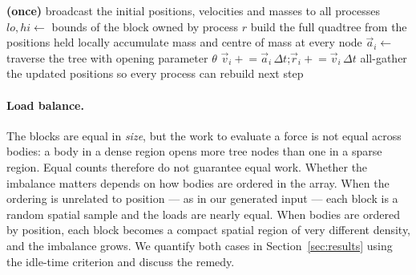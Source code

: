 \documentclass[11pt,a4paper]{article}
\begin{document}
\begin{algorithm}[H]
\caption{One Barnes--Hut time step on process $r$ of $P$ (MPI; the hybrid
program threads the marked loop with OpenMP).}
\label{alg:mpi}
\begin{algorithmic}[1]
\State \textbf{(once)} broadcast the initial positions, velocities and masses to all processes
\State $lo,hi \gets$ bounds of the block owned by process $r$ 
  \State build the full quadtree from the positions held locally 
  \State accumulate mass and centre of mass at every node
   
    \State $\vec a_i \gets$ traverse the tree with opening parameter $\theta$
  \EndFor
    \State $\vec v_i \mathrel{+}= \vec a_i\,\Delta t$;\quad $\vec r_i \mathrel{+}= \vec v_i\,\Delta t$
  \EndFor
  \State all-gather the updated positions so every process can rebuild next step
\EndFor
\end{algorithmic}
\end{algorithm}

\paragraph{Load balance.}
The blocks are equal in \emph{size}, but the work to evaluate a force is not equal
across bodies: a body in a dense region opens more tree nodes than one in a sparse
region. Equal counts therefore do not guarantee equal work. Whether the imbalance
matters depends on how bodies are ordered in the array. When the ordering is
unrelated to position --- as in our generated input --- each block is a random
spatial sample and the loads are nearly equal. When bodies are ordered by position,
each block becomes a compact spatial region of very different density, and the
imbalance grows. We quantify both cases in Section~\ref{sec:results} using the
idle-time criterion and discuss the remedy.
\end{document}
